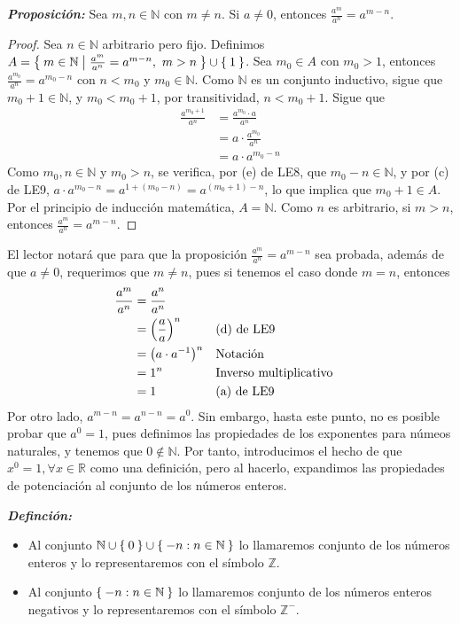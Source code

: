 \documentclass[11pt]{article}
\newcommand{\N}{\mathbb{N}}
\newcommand{\Z}{\mathbb{Z}}
\newcommand{\R}{\mathbb{R}}
\newcommand{\bfit}[1]{\textbf{\textit{#1}}}
\let\set\Set
\let\union\cup
\begin{document}
 \bfit{Proposición:} Sea $m,n\in \N$ con $m\neq n$. Si $a\neq 0$, entonces $\frac{a^m}{a^n} = a^{m-n}$.
 
 \begin{proof}
   Sea $n\in \N$ arbitrario pero fijo. Definimos $A=\set{m \in \N|\frac{a^m}{a^n}=a^{m-n}, \ m>n}\union\set{1}$. 
   Sea $m_0 \in A$ con $m_0>1$, entonces $\frac{a^{m_0}}{a^n} = a^{m_0-n}$ con $n<m_0$ y $m_0\in \N$. Como $\N$ es un conjunto inductivo, sigue que $m_0+1\in \N$, y $m_0<m_0+1$, por transitividad, $n<m_0+1$. Sigue que \begin{align*}
    \frac{a^{m_0+1}}{a^n} &= \frac{a^{m_0}\cdot a}{a^n}\\
    &= a\cdot \frac{a^{m_0}}{a^n}\\
    &= a\cdot a^{m_0-n}
   \end{align*}
   Como $m_0,n \in \N$ y $m_0>n$, se verifica, por (e) de LE8, que $m_0-n\in \N$, y por (c) de LE9, $a\cdot a^{m_0-n} = a^{1+(m_0-n)} = a^{(m_0+1)-n}$, lo que implica que $m_0+1 \in A$. Por el principio de inducción matemática, $A=\N$. Como $n$ es arbitrario, si $m>n$, entonces $\frac{a^m}{a^n} = a^{m-n}$.
 \end{proof}

 El lector notará que para que la proposición $\frac{a^m}{a^n} = a^{m-n}$ sea probada, además de que $a\neq 0$, requerimos que $m\neq n$, pues si tenemos el caso donde $m=n$, entonces \begin{align*}
  \frac{a^m}{a^n} &= \frac{a^n}{a^n}\\
  &= \qty(\frac{a}{a})^n && \text{(d) de LE9}\\
  &= \bigl(a\cdot a^{-1}\bigr)^n && \text{Notación}\\
  &= 1^n && \text{Inverso multiplicativo}\\
  &= 1 && \text{(a) de LE9}
\end{align*}
Por otro lado, $a^{m-n} = a^{n-n} = a^0$. Sin embargo, hasta este punto, no es posible probar que $a^0 = 1$, pues definimos las propiedades de los exponentes para númeos naturales, y tenemos que $0\notin \N$. Por tanto, introducimos el hecho de que $x^0 = 1, \forall x\in \R$ como una definición, pero al hacerlo, expandimos las propiedades de potenciación al conjunto de los números enteros.

\pagebreak

  \bfit{Definción:} \begin{itemize}
    \item Al conjunto $\N \cup \set{0} \cup \set{-n: n\in \N}$ lo llamaremos conjunto de los números enteros y lo representaremos con el símbolo $\Z$.
    \item Al conjunto $\set{-n: n\in \N}$ lo llamaremos conjunto de los números enteros negativos y lo representaremos con el símbolo $\Z^-$.
   \end{itemize}
   
\end{document}

